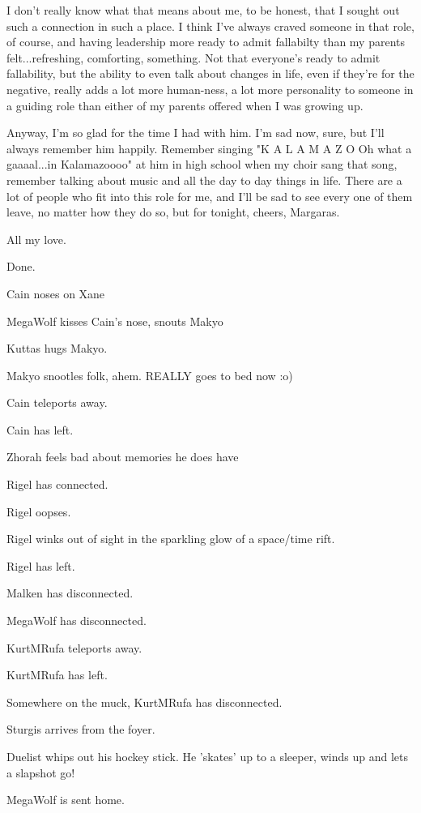 I don't really know what that means about me, to be honest, that I sought out such a connection in such a place.  I think I've always craved someone in that role, of course, and having leadership more ready to admit fallabilty than my parents felt...refreshing, comforting, something.  Not that everyone's ready to admit fallability, but the ability to even talk about changes in life, even if they're for the negative, really adds a lot more human-ness, a lot more personality to someone in a guiding role than either of my parents offered when I was growing up.

Anyway, I'm so glad for the time I had with him.  I'm sad now, sure, but I'll always remember him happily.  Remember singing "K A L A M A Z O Oh what a gaaaal...in Kalamazoooo" at him in high school when my choir sang that song, remember talking about music and all the day to day things in life.  There are a lot of people who fit into this role for me, and I'll be sad to see every one of them leave, no matter how they do so, but for tonight, cheers, Margaras.

All my love.

\noindent Done.

Cain noses on Xane

MegaWolf kisses Cain's nose, snouts Makyo

Kuttas hugs Makyo.

Makyo snootles folk, ahem.  REALLY goes to bed now :o)

Cain teleports away.

Cain has left.

Zhorah feels bad about memories he does have

Rigel has connected.

Rigel oopses.

Rigel winks out of sight in the sparkling glow of a space/time rift.

Rigel has left.

Malken has disconnected.

MegaWolf has disconnected.

KurtMRufa teleports away.

KurtMRufa has left.

Somewhere on the muck, KurtMRufa has disconnected.

Sturgis arrives from the foyer.

Duelist whips out his hockey stick. He 'skates' up to a sleeper, winds up and lets a slapshot go!

MegaWolf is sent home.

